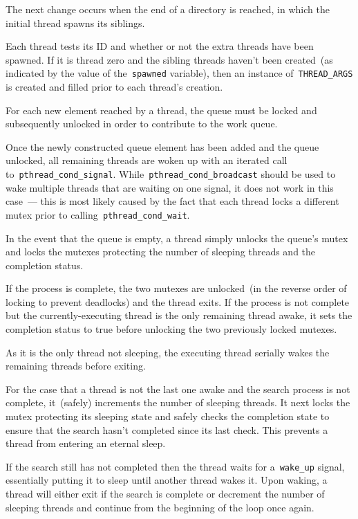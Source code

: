 \documentclass{article}
\newcommand{\chompclst}[2]{
	\begin{center}
	\parbox{.6\textwidth}{
	}
	\end{center}
}
\newcommand{\ttt}[1]{\texttt{#1}}
\begin{document}
The next change occurs when the end of a directory is reached, in which the
initial thread spawns its siblings.
%
\chompclst{40}{66}
%
Each thread tests its ID and whether or not the extra threads have been
spawned.  If it is thread zero and the sibling threads haven't been created~(as
indicated by the value of the~\ttt{spawned} variable), then an instance
of~\ttt{THREAD\_ARGS} is created and filled prior to each thread's creation.

For each new element reached by a thread, the queue must be locked and
subsequently unlocked in order to contribute to the work queue.
%
\chompclst{69}{77}
%
Once the newly constructed queue element has been added and the queue unlocked,
all remaining threads are woken up with an iterated call
to~\ttt{pthread\_cond\_signal}.  While~\ttt{pthread\_cond\_broadcast} should be
used to wake multiple threads that are waiting on one signal, it does not work
in this case~--- this is most likely caused by the fact that each thread locks
a different mutex prior to calling~\ttt{pthread\_cond\_wait}.

In the event that the queue is empty, a thread simply unlocks the queue's mutex
and locks the mutexes protecting the number of sleeping threads and the
completion status.
%
\chompclst{85}{96}
%
If the process is complete, the two mutexes are unlocked~(in the reverse order
of locking to prevent deadlocks) and the thread exits.  If the process is not
complete but the currently-executing thread is the only remaining thread awake,
it sets the completion status to true before unlocking the two previously
locked mutexes.
%
\chompclst{99}{110}
%
As it is the only thread not sleeping, the executing thread serially wakes the
remaining threads before exiting.

For the case that a thread is not the last one awake and the search process is
not complete, it~(safely) increments the number of sleeping threads.  It next
locks the mutex protecting its sleeping state and safely checks the completion
state to ensure that the search hasn't completed since its last check.  This
prevents a thread from entering an eternal sleep.
%
\chompclst{113}{141}
%
If the search still has not completed then the thread waits for
a~\ttt{wake\_up} signal, essentially putting it to sleep until another thread
wakes it.  Upon waking, a thread will either exit if the search is complete or
decrement the number of sleeping threads and continue from the beginning of the
loop once again.
\end{document}
